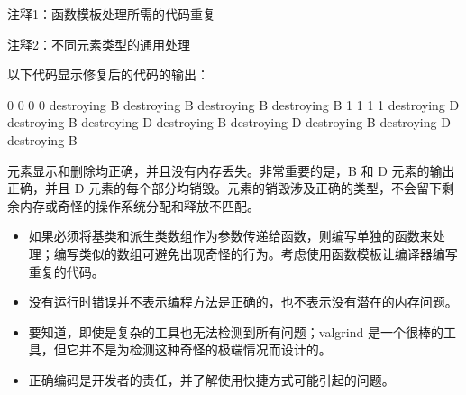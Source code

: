 {\footnotesize
注释1：函数模板处理所需的代码重复

注释2：不同元素类型的通用处理
}

以下代码显示修复后的代码的输出：

\begin{shell}
0
0
0
0
destroying B
destroying B
destroying B
destroying B
1
1
1
1
destroying D
destroying B
destroying D
destroying B
destroying D
destroying B
destroying D
destroying B
\end{shell}

元素显示和删除均正确，并且没有内存丢失。非常重要的是，B 和 D 元素的输出正确，并且 D 元素的每个部分均销毁。元素的销毁涉及正确的类型，不会留下剩余内存或奇怪的操作系统分配和释放不匹配。


\begin{itemize}
\item
如果必须将基类和派生类数组作为参数传递给函数，则编写单独的函数来处理；编写类似的数组可避免出现奇怪的行为。考虑使用函数模板让编译器编写重复的代码。

\item
没有运行时错误并不表示编程方法是正确的，也不表示没有潜在的内存问题。

\item
要知道，即使是复杂的工具也无法检测到所有问题；valgrind 是一个很棒的工具，但它并不是为检测这种奇怪的极端情况而设计的。

\item
正确编码是开发者的责任，并了解使用快捷方式可能引起的问题。
\end{itemize}












